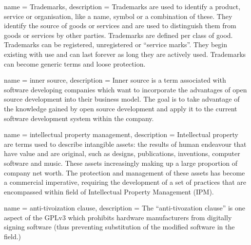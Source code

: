  { name = {Trademarks}, description
  = {Trademarks are used to identify a product, service or
    organisation, like a name, symbol or a combination of these. They
    identify the source of goods or services and are used to
    distinguish them from goods or services by other
    parties. Trademarks are defined per class of good. Trademarks can
    be registered, unregistered or “service marks”. They begin
    existing with use and can last forever as long they are actively
    used. Trademarks can become generic terms and loose protection.}}

 { name = {inner source},
  description = {Inner source is a term associated with software
    developing companies which want to incorporate the advantages of
    open source development into their business model. The goal is to
    take advantage of the knowledge gained by open source development
    and apply it to the current software development system within the
    company.\cite{fsry:innersource-2015}}}


 { name = {intellectual property
    management}, description = {Intellectual property are
    terms used to describe intangible assets: the results of human
    endeavour that have value and are original, such as designs,
    publications, inventions, computer software and music.  These
    assets increasingly making up a large proportion of company net
    worth. The protection and management of these assets has become a
    commercial imperative, requiring the development of a set of
    practices that are encompassed within field of Intellectual
    Property Management (IPM).}}

 { name =
  {anti-tivoization clause}, description = {The ``anti-tivozation
    clause'' is one aspect of the GPLv3 which prohibits hardware
    manufacturers from digitally signing software (thus preventing
    substitution of the modified software in the field.)}}
